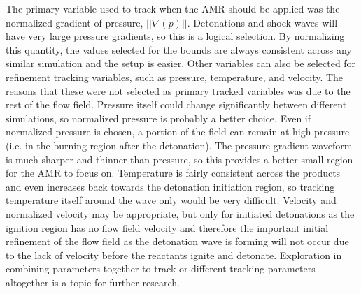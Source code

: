 The primary variable used to track when the AMR should be applied was the normalized gradient of pressure, \( ||\nabla(p)||\). Detonations  and shock waves will have very large pressure gradients, so this is a logical selection. By normalizing this quantity, the values selected for the bounds are always consistent across any similar simulation and the setup is easier. Other variables can also be selected for refinement tracking variables, such as pressure, temperature, and velocity. The reasons that these were not selected as primary tracked variables was due to the rest of the flow field. Pressure itself could change significantly between different simulations, so normalized pressure is probably a better choice. Even if normalized pressure is chosen, a portion of the field can remain at high pressure (i.e. in the burning region after the detonation). The pressure gradient waveform is much sharper and thinner than pressure, so this provides a better small region for the AMR to focus on. Temperature is fairly consistent across the products and even increases back towards the detonation initiation region, so tracking temperature itself around the wave only would be very difficult. Velocity and normalized velocity may be appropriate, but only for initiated detonations as the ignition region has no flow field velocity and therefore the important initial refinement of the flow field as the detonation wave is forming will not occur due to the lack of velocity before the reactants ignite and detonate. Exploration in combining parameters together to track or different tracking parameters altogether is a topic for further research. 


